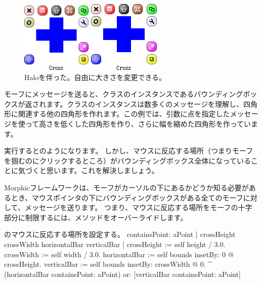 \documentclass[a4paper,10pt,twoside]{book}
\begin{document}
\begin{figure}[hbt]
	\ifluluelse
		{\centerline{\includegraphics[width=0.3\textwidth]{NewCross}}}
		{\centerline{\includegraphics{NewCross}}}
	\caption{Haloを伴った。自由に大きさを変更できる。
		}
\end{figure}


モーフにメッセージを送ると、クラスのインスタンスであるバウンディングボックスが返されます。クラスのインスタンスは数多くのメッセージを理解し、四角形に関連する他の四角形を作れます。この例では、引数に点を指定したメッセージを使って高さを低くした四角形を作り、さらに幅を縮めた四角形を作っています。

実行するとのようになります。
しかし、マウスに反応する場所（つまりモーフを掴むのにクリックするところ）がバウンディングボックス全体になっていることに気づくと思います。これを解決しましょう。

Morphicフレームワークは、モーフがカーソルの下にあるかどうか知る必要があるとき、マウスポインタの下にバウンディングボックスがある全てのモーフに対して、メッセージを送ります。
つまり、マウスに反応する場所をモーフの十字部分に制限するには、メソッドをオーバーライドします。



\begin{method}[firstContains]{のマウスに反応する場所を設定する。}
containsPoint: aPoint
	| crossHeight crossWidth horizontalBar verticalBar |
	crossHeight := self height / 3.0.
	crossWidth := self width / 3.0.
	horizontalBar := self bounds insetBy: 0 @ crossHeight.
	verticalBar := self bounds insetBy: crossWidth @ 0.
	^ (horizontalBar containsPoint: aPoint)
		or: [verticalBar containsPoint: aPoint]
\end{method}
\end{document}
